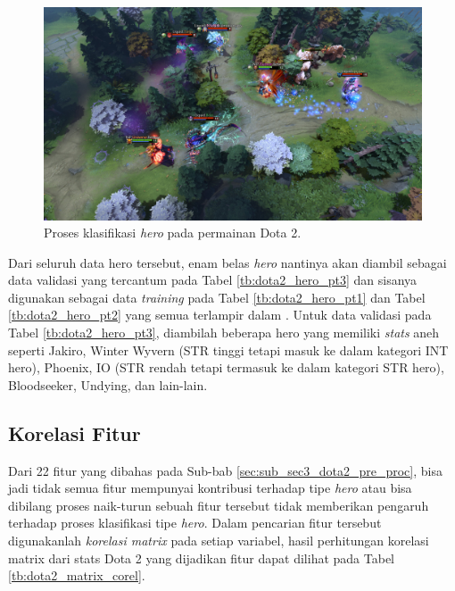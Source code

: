 \begin{figure} [!h] \centering
	\includegraphics[scale=0.13]{img/dota2_gameplay.jpg}
	\caption{Proses klasifikasi \textit{hero} pada permainan Dota 2.}
	\label{fig:dota2_gameplay}
\end{figure}

Dari seluruh data hero tersebut, enam belas \textit{hero} nantinya akan diambil sebagai data validasi yang tercantum pada Tabel \ref{tb:dota2_hero_pt3} dan sisanya digunakan sebagai data \textit{training} pada Tabel \ref{tb:dota2_hero_pt1} dan Tabel \ref{tb:dota2_hero_pt2} yang semua terlampir dalam . Untuk data validasi pada Tabel \ref{tb:dota2_hero_pt3}, diambilah beberapa hero yang memiliki \textit{stats} aneh seperti Jakiro, Winter Wyvern (STR tinggi tetapi masuk ke dalam kategori INT hero), Phoenix, IO (STR rendah tetapi termasuk ke dalam kategori STR hero), Bloodseeker, Undying, dan lain-lain.
\vspace{1ex}

\subsection{Korelasi Fitur}
\label{sec:sub_sec3_dota2_feature_corel}
\vspace{1ex}

Dari 22 fitur yang dibahas pada Sub-bab \ref{sec:sub_sec3_dota2_pre_proc}, bisa jadi tidak semua fitur mempunyai kontribusi terhadap tipe \textit{hero} atau bisa dibilang proses naik-turun sebuah fitur tersebut tidak memberikan pengaruh terhadap proses klasifikasi tipe \textit{hero}. Dalam pencarian fitur tersebut digunakanlah \textit{korelasi matrix} pada setiap variabel, hasil perhitungan korelasi matrix dari stats Dota 2 yang dijadikan fitur dapat dilihat pada Tabel \ref{tb:dota2_matrix_corel}.
\vspace{-1ex}

